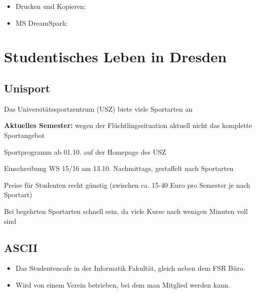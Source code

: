 \documentclass[a4paper,12pt]{report}
\begin{document}
\begin{itemize}
	\item Drucken und Kopieren: 
	\item MS DreamSpark:
\end{itemize}

\section{Studentisches Leben in Dresden}

\subsection{Unisport}
Das Universitätssportzentrum (USZ) biete viele Sportarten an
\begin{itemize*}
\item \textbf{Aktuelles Semester:} wegen der Flüchtlingssituation aktuell nicht das komplette Sportangebot
\item Sportprogramm ab 01.10. auf der Homepage des USZ
\item Einschreibung WS 15/16 am 13.10. Nachmittags, gestaffelt nach Sportarten
\item Preise für Studenten recht günstig (zwischen ca. 15-40 Euro pro Semester je nach Sportart)
\item Bei begehrten Sportarten schnell sein, da viele Kurse nach wenigen Minuten voll sind
\end{itemize*}

\subsection{ASCII}
\begin{itemize}
\item Das Studentencafe in der Informatik Fakultät, gleich neben dem FSR Büro.
\item Wird von einem Verein betrieben, bei dem man Mitglied werden kann.
\end{itemize}
\end{document}
